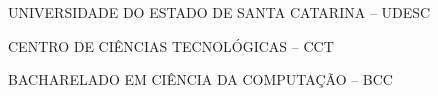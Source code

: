 

\renewcommand{\imprimircapa}{%
	\begin{capa}%
		\center

		{\fontseries{b}\selectfont\MakeTextUppercase{UNIVERSIDADE DO ESTADO DE SANTA CATARINA -- UDESC}}
		
		{\fontseries{b}\selectfont\MakeTextUppercase{CENTRO DE CIÊNCIAS TECNOLÓGICAS -- CCT  }}
		
		{\fontseries{b}\selectfont\MakeTextUppercase{BACHARELADO EM CIÊNCIA DA COMPUTAÇÃO -- BCC  }}
		
		\vfill
		
		{\fontseries{b}\selectfont\MakeTextUppercase{\normalsize\imprimirautor}}
		
		\vfill
		\begin{center}
			{\fontseries{b}\selectfont\MakeTextUppercase{\imprimirtitulo}}
		\end{center}
		\vfill
		
		\vfill
		
		{\fontseries{b}\selectfont\MakeTextUppercase{\imprimirlocal}}
		\par
		{\selectfont \imprimirdata}
		\vspace*{1cm}
	\end{capa}
}

\imprimircapa